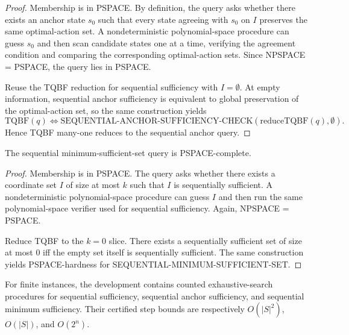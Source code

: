 
\begin{proof}
Membership is in PSPACE. By definition, the query asks whether there exists an anchor state $s_0$ such that every state agreeing with $s_0$ on $I$ preserves the same optimal-action set. A nondeterministic polynomial-space procedure can guess $s_0$ and then scan candidate states one at a time, verifying the agreement condition and comparing the corresponding optimal-action sets. Since NPSPACE = PSPACE, the query lies in PSPACE.

Reuse the TQBF reduction for sequential sufficiency with $I=\emptyset$. At empty information, sequential anchor sufficiency is equivalent to global preservation of the optimal-action set, so the same construction yields
\[
\mathrm{TQBF}(q)
\iff
\mathrm{SEQUENTIAL\mbox{-}ANCHOR\mbox{-}SUFFICIENCY\mbox{-}CHECK}(\mathrm{reduceTQBF}(q),\emptyset).
\]
Hence TQBF many-one reduces to the sequential anchor query.
\end{proof}

\begin{theorem}\label{thm:sequential-minimum-hard}
The sequential minimum-sufficient-set query is PSPACE-complete.
\end{theorem}


\begin{proof}
Membership is in PSPACE. The query asks whether there exists a coordinate set $I$ of size at most $k$ such that $I$ is sequentially sufficient. A nondeterministic polynomial-space procedure can guess $I$ and then run the same polynomial-space verifier used for sequential sufficiency. Again, NPSPACE = PSPACE.

Reduce TQBF to the $k=0$ slice. There exists a sequentially sufficient set of size at most $0$ iff the empty set itself is sequentially sufficient. The same construction yields PSPACE-hardness for SEQUENTIAL-MINIMUM-SUFFICIENT-SET.
\end{proof}

\begin{proposition}\label{prop:sequential-explicit-search}
For finite instances, the development contains counted exhaustive-search procedures for sequential sufficiency, sequential anchor sufficiency, and sequential minimum sufficiency. Their certified step bounds are respectively $O(|S|^2)$, $O(|S|)$, and $O(2^n)$.
\end{proposition}

